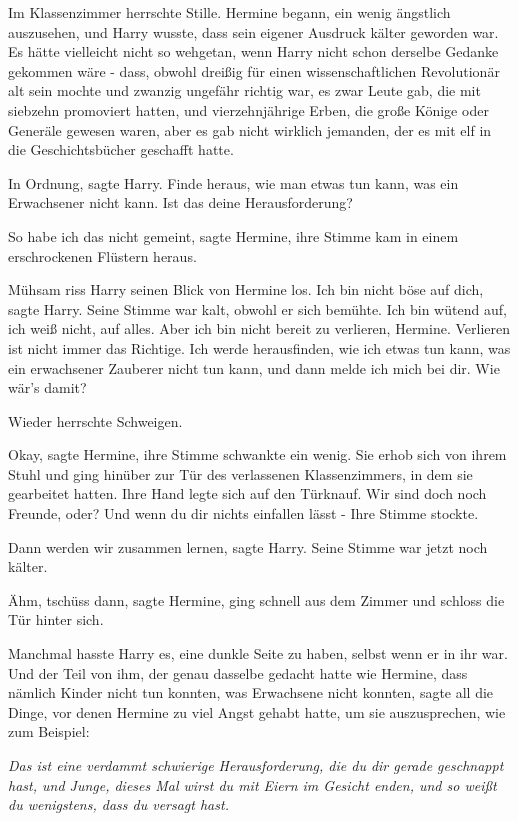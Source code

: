 Im Klassenzimmer herrschte Stille. Hermine begann, ein wenig ängstlich
auszusehen, und Harry wusste, dass sein eigener Ausdruck kälter geworden war. Es
hätte vielleicht nicht so wehgetan, wenn Harry nicht schon derselbe Gedanke
gekommen wäre - dass, obwohl dreißig für einen wissenschaftlichen Revolutionär
alt sein mochte und zwanzig ungefähr richtig war, es zwar Leute gab, die mit
siebzehn promoviert hatten, und vierzehnjährige Erben, die große Könige oder
Generäle gewesen waren, aber es gab nicht wirklich jemanden, der es mit elf in
die Geschichtsbücher geschafft hatte.

\glqq{}In Ordnung\grqq{}, sagte Harry. \glqq{}Finde heraus, wie man etwas tun
kann, was ein Erwachsener nicht kann. Ist das deine Herausforderung?\grqq{}

\glqq{}So habe ich das nicht gemeint\grqq{}, sagte Hermine, ihre Stimme kam in
einem erschrockenen Flüstern heraus.

Mühsam riss Harry seinen Blick von Hermine los. \glqq{}Ich bin nicht böse auf
dich\grqq{}, sagte Harry. Seine Stimme war kalt, obwohl er sich bemühte. \glqq{}
Ich bin wütend auf, ich weiß nicht, auf alles. Aber ich bin nicht bereit zu
verlieren, Hermine. Verlieren ist nicht immer das Richtige. Ich werde
herausfinden, wie ich etwas tun kann, was ein erwachsener Zauberer nicht tun
kann, und dann melde ich mich bei dir. Wie wär's damit?\grqq{}

Wieder herrschte Schweigen.

\glqq{}Okay\grqq{}, sagte Hermine, ihre Stimme schwankte ein wenig. Sie erhob
sich von ihrem Stuhl und ging hinüber zur Tür des verlassenen Klassenzimmers, in
dem sie gearbeitet hatten. Ihre Hand legte sich auf den Türknauf. \glqq{}Wir sind
doch noch Freunde, oder? Und wenn du dir nichts einfallen lässt -\grqq{} Ihre
Stimme stockte.

\glqq{}Dann werden wir zusammen lernen\grqq{}, sagte Harry. Seine Stimme war
jetzt noch kälter.

\glqq{}Ähm, tschüss dann\grqq{}, sagte Hermine, ging schnell aus dem Zimmer und
schloss die Tür hinter sich.

Manchmal hasste Harry es, eine dunkle Seite zu haben, selbst wenn er in ihr war.
Und der Teil von ihm, der genau dasselbe gedacht hatte wie Hermine, dass nämlich
Kinder nicht tun konnten, was Erwachsene nicht konnten, sagte all die Dinge, vor
denen Hermine zu viel Angst gehabt hatte, um sie auszusprechen, wie zum
Beispiel:

\emph{Das ist eine verdammt schwierige Herausforderung, die du dir gerade
geschnappt hast, und Junge, dieses Mal wirst du mit Eiern im Gesicht enden,
und so weißt du wenigstens, dass du versagt hast.}


